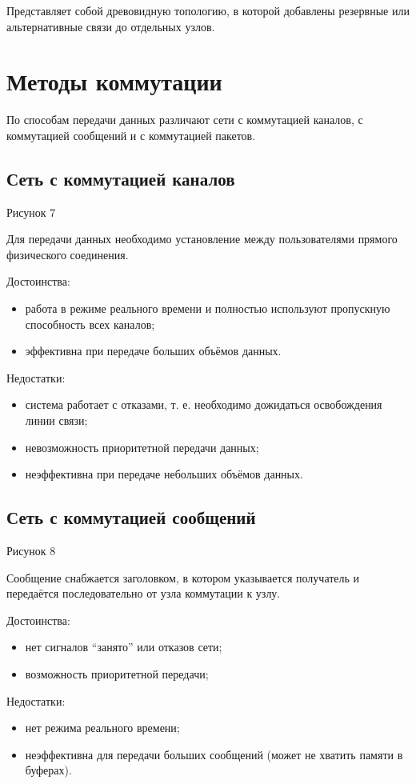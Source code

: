 \documentclass[12pt, russian, oneside, article]{ncc}
\begin{document}
Представляет собой древовидную топологию, в которой добавлены резервные или альтернативные связи до отдельных узлов.
\section{Методы коммутации}
\label{sec-3}


По способам передачи данных различают сети с коммутацией каналов, с коммутацией сообщений и с коммутацией пакетов.
\subsection{Сеть с коммутацией каналов}
\label{sec-3_1}


Рисунок 7

Для передачи данных необходимо установление между пользователями прямого физического соединения.

Достоинства:
\begin{itemize}
\item работа в режиме реального времени и полностью используют пропускную способность всех каналов;
\item эффективна при передаче больших объёмов данных.
\end{itemize}

Недостатки:
\begin{itemize}
\item система работает с отказами, т. е. необходимо дожидаться освобождения линии связи;
\item невозможность приоритетной передачи данных;
\item неэффективна при передаче небольших объёмов данных.
\end{itemize}
\subsection{Сеть с коммутацией сообщений}
\label{sec-3_2}


Рисунок 8

Сообщение снабжается заголовком, в котором указывается получатель и передаётся последовательно от узла коммутации к узлу.

Достоинства:
\begin{itemize}
\item нет сигналов ``занято'' или отказов сети;
\item возможность приоритетной передачи;
\end{itemize}

Недостатки:
\begin{itemize}
\item нет режима реального времени;
\item неэффективна для передачи больших сообщений (может не хватить памяти в буферах).
\end{itemize}
\end{document}
